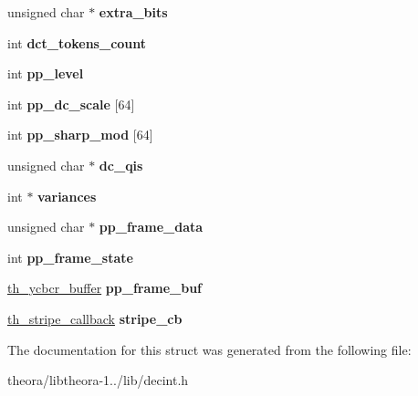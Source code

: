 \begin{DoxyCompactItemize}
\item 
\hypertarget{structth__dec__ctx_a898ec520b6896fea2542f82b8545ada4}{unsigned char $\ast$ {\bfseries extra\+\_\+bits}}\label{structth__dec__ctx_a898ec520b6896fea2542f82b8545ada4}

\item 
\hypertarget{structth__dec__ctx_a9ae74bf566fb4bf2b3a1a970c4e7e733}{int {\bfseries dct\+\_\+tokens\+\_\+count}}\label{structth__dec__ctx_a9ae74bf566fb4bf2b3a1a970c4e7e733}

\item 
\hypertarget{structth__dec__ctx_a543e067c8de8a2bcf60ffcf9a2fbf3b3}{int {\bfseries pp\+\_\+level}}\label{structth__dec__ctx_a543e067c8de8a2bcf60ffcf9a2fbf3b3}

\item 
\hypertarget{structth__dec__ctx_a1d6d27cf06332f878413c926bdf89f07}{int {\bfseries pp\+\_\+dc\+\_\+scale} \mbox{[}64\mbox{]}}\label{structth__dec__ctx_a1d6d27cf06332f878413c926bdf89f07}

\item 
\hypertarget{structth__dec__ctx_a86e1e2dc65737e88e93c200bf138d7d9}{int {\bfseries pp\+\_\+sharp\+\_\+mod} \mbox{[}64\mbox{]}}\label{structth__dec__ctx_a86e1e2dc65737e88e93c200bf138d7d9}

\item 
\hypertarget{structth__dec__ctx_ab8e028f7ebeeef96fc9e7212f0f81192}{unsigned char $\ast$ {\bfseries dc\+\_\+qis}}\label{structth__dec__ctx_ab8e028f7ebeeef96fc9e7212f0f81192}

\item 
\hypertarget{structth__dec__ctx_ad3912d3b62e05b1bf43b95e7465f4809}{int $\ast$ {\bfseries variances}}\label{structth__dec__ctx_ad3912d3b62e05b1bf43b95e7465f4809}

\item 
\hypertarget{structth__dec__ctx_a89d99e7a65b27fb842b410cb97bef5fc}{unsigned char $\ast$ {\bfseries pp\+\_\+frame\+\_\+data}}\label{structth__dec__ctx_a89d99e7a65b27fb842b410cb97bef5fc}

\item 
\hypertarget{structth__dec__ctx_a137c731051cad7c1403b7962ae7ba32c}{int {\bfseries pp\+\_\+frame\+\_\+state}}\label{structth__dec__ctx_a137c731051cad7c1403b7962ae7ba32c}

\item 
\hypertarget{structth__dec__ctx_a6b8d914ac26b93ed50774f04a6758fb5}{\hyperlink{theora_2libtheora-1_81_81_2include_2theora_2codec_8h_a343f7cfabad179cc4fe527cf06873f45}{th\+\_\+ycbcr\+\_\+buffer} {\bfseries pp\+\_\+frame\+\_\+buf}}\label{structth__dec__ctx_a6b8d914ac26b93ed50774f04a6758fb5}

\item 
\hypertarget{structth__dec__ctx_a2dad99753756cfc81faf92ee23c6aa30}{\hyperlink{structth__stripe__callback}{th\+\_\+stripe\+\_\+callback} {\bfseries stripe\+\_\+cb}}\label{structth__dec__ctx_a2dad99753756cfc81faf92ee23c6aa30}

\end{DoxyCompactItemize}


The documentation for this struct was generated from the following file\+:\begin{DoxyCompactItemize}
\item 
theora/libtheora-\/1../lib/decint.\+h\end{DoxyCompactItemize}
